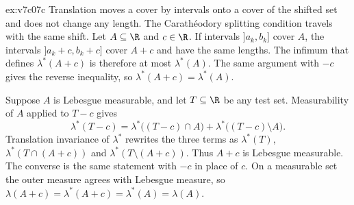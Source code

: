 \begin{solution}{ex:v7c07c}
\idea Translation moves a cover by intervals onto a cover of the shifted set and does not change any length.
The Carath\'eodory splitting condition travels with the same shift.
\writeup Let $A\subseteq\R$ and $c\in\R$.
If intervals $]a_k,b_k]$ cover $A$, the intervals $]a_k+c,b_k+c]$ cover $A+c$ and have the same lengths.
The infimum that defines $\lambda^*(A+c)$ is therefore at most $\lambda^*(A)$.
The same argument with $-c$ gives the reverse inequality, so $\lambda^*(A+c)=\lambda^*(A)$.

Suppose $A$ is Lebesgue measurable, and let $T\subseteq\R$ be any test set.
Measurability of $A$ applied to $T-c$ gives
\[
\lambda^*(T-c)=\lambda^*\bigl((T-c)\cap A\bigr)+\lambda^*\bigl((T-c)\setminus A\bigr).
\]
Translation invariance of $\lambda^*$ rewrites the three terms as $\lambda^*(T)$, $\lambda^*(T\cap(A+c))$ and $\lambda^*(T\setminus(A+c))$.
Thus $A+c$ is Lebesgue measurable.
The converse is the same statement with $-c$ in place of $c$.
On a measurable set the outer measure agrees with Lebesgue measure, so $\lambda(A+c)=\lambda^*(A+c)=\lambda^*(A)=\lambda(A)$.
\end{solution}

